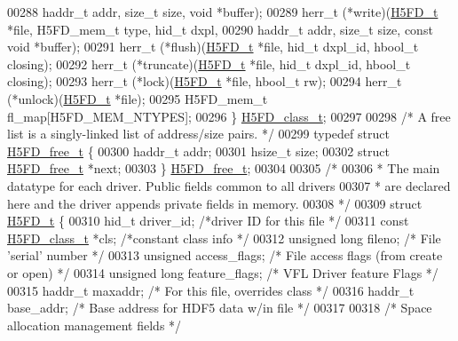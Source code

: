 \begin{DoxyCode}
00288                     haddr\_t addr, \textcolor{keywordtype}{size\_t} size, \textcolor{keywordtype}{void} *buffer);
00289     herr\_t  (*write)(\hyperlink{struct_h5_f_d__t}{H5FD\_t} *file, H5FD\_mem\_t type, hid\_t dxpl,
00290                      haddr\_t addr, \textcolor{keywordtype}{size\_t} size, \textcolor{keyword}{const} \textcolor{keywordtype}{void} *buffer);
00291     herr\_t  (*flush)(\hyperlink{struct_h5_f_d__t}{H5FD\_t} *file, hid\_t dxpl\_id, hbool\_t closing);
00292     herr\_t  (*truncate)(\hyperlink{struct_h5_f_d__t}{H5FD\_t} *file, hid\_t dxpl\_id, hbool\_t closing);
00293     herr\_t  (*lock)(\hyperlink{struct_h5_f_d__t}{H5FD\_t} *file, hbool\_t rw);
00294     herr\_t  (*unlock)(\hyperlink{struct_h5_f_d__t}{H5FD\_t} *file);
00295     H5FD\_mem\_t fl\_map[H5FD\_MEM\_NTYPES];
00296 \} \hyperlink{struct_h5_f_d__class__t}{H5FD\_class\_t};
00297 
00298 \textcolor{comment}{/* A free list is a singly-linked list of address/size pairs. */}
00299 \textcolor{keyword}{typedef} \textcolor{keyword}{struct }\hyperlink{struct_h5_f_d__free__t}{H5FD\_free\_t} \{
00300     haddr\_t     addr;
00301     hsize\_t     size;
00302     \textcolor{keyword}{struct }\hyperlink{struct_h5_f_d__free__t}{H5FD\_free\_t}   *next;
00303 \} \hyperlink{struct_h5_f_d__free__t}{H5FD\_free\_t};
00304 
00305 \textcolor{comment}{/*}
00306 \textcolor{comment}{ * The main datatype for each driver. Public fields common to all drivers}
00307 \textcolor{comment}{ * are declared here and the driver appends private fields in memory.}
00308 \textcolor{comment}{ */}
00309 \textcolor{keyword}{struct }\hyperlink{struct_h5_f_d__t}{H5FD\_t} \{
00310     hid\_t               driver\_id;      \textcolor{comment}{/*driver ID for this file   */}
00311     \textcolor{keyword}{const} \hyperlink{struct_h5_f_d__class__t}{H5FD\_class\_t} *cls;            \textcolor{comment}{/*constant class info       */}
00312     \textcolor{keywordtype}{unsigned} \textcolor{keywordtype}{long}       fileno;         \textcolor{comment}{/* File 'serial' number     */}
00313     \textcolor{keywordtype}{unsigned}            access\_flags;   \textcolor{comment}{/* File access flags (from create or open) */}
00314     \textcolor{keywordtype}{unsigned} \textcolor{keywordtype}{long}       feature\_flags;  \textcolor{comment}{/* VFL Driver feature Flags */}
00315     haddr\_t             maxaddr;        \textcolor{comment}{/* For this file, overrides class */}
00316     haddr\_t             base\_addr;      \textcolor{comment}{/* Base address for HDF5 data w/in file */}
00317 
00318     \textcolor{comment}{/* Space allocation management fields */}

\end{DoxyCode}
